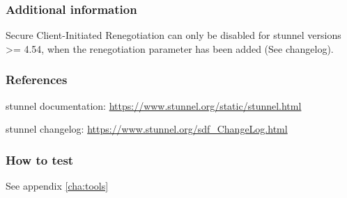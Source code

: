 \subsubsection{Additional information}
Secure Client-Initiated Renegotiation can only be disabled for stunnel versions >= 4.54, when the renegotiation parameter has been added (See changelog).

\subsubsection{References} 
\begin{itemize*}
  \item stunnel documentation: \url{https://www.stunnel.org/static/stunnel.html}
  \item stunnel changelog: \url{https://www.stunnel.org/sdf_ChangeLog.html}
\end{itemize*}


\subsubsection{How to test} 
See appendix \ref{cha:tools}

